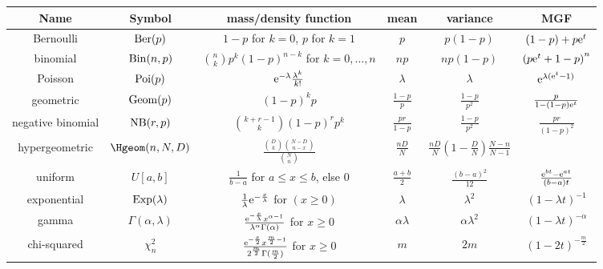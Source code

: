 \begin{center}
{\footnotesize
  \begin{tabular}{|c|c|c|c|c|c|}
    \hline
    Name&Symbol&mass/density function&mean&variance&MGF\\
    \hline
    Bernoulli
        &\(\operatorname{Ber}(p)\)%
        &\(1-p\) for \(k=0\), \(p\) for \(k=1\)%
        &\(p\)
        &\(p(1-p)\)
        &\((1-p)+p\mathrm{e}^t\)
    \\
    binomial
        &\(\operatorname{Bin}(n,p)\)%
        &\(\binom{n}{k}p^k(1-p)^{n-k}\) for \(k=0,\dotsc,n\)
        &\(np\)
        &\(np(1-p)\)
        &\({(p\mathrm{e}^t+1-p)}^n\)
    \\
    Poisson
        &\(\operatorname{Poi}(p)\)
        &\(\mathrm{e}^{-\lambda}\frac{\lambda^k}{k!}\)
        &\(\lambda\)
        &\(\lambda\)
        &\(\mathrm{e}^{\lambda(\mathrm{e}^t-1)}\)
    \\
    geometric
        &\(\operatorname{Geom}(p)\)
        &\((1-p)^k p\)
        &\(\frac{1-p}{p}\)
        &\(\frac{1-p}{p^2}\)
        &\(\frac{p}{1-(1-p)\mathrm{e}^t}\)
    \\
    negative binomial
        &\(\operatorname{NB}(r,p)\)
        &\(\binom{k+r-1}{k}(1-p)^rp^k\)
        &\(\frac{pr}{1-p}\)
        &\(\frac{1-p}{p^2}\)
        &\(\frac{pr}{(1-p)^2}\)
    \\
    hypergeometric
        &\(\Hgeom(n,N,D)\)
        &\(\frac{\binom{D}{k}\binom{N-D}{n-x}}{\binom{N}{n}}\)
        &\(\frac{nD}{N}\)
        &\(\frac{nD}{N}(1-\frac{D}{N})\frac{N-n}{N-1}\)
        &
    \\
    uniform
        &\(U[a,b]\)
        &\(\frac{1}{b-a}\) for \(a\leq x\leq b\), else \(0\)
        &\(\frac{a+b}{2}\)
        &\(\frac{(b-a)^2}{12}\)
        &\(\frac{\mathrm{e}^{bt}-\mathrm{e}^{at}}{(b-a)t}\)
    \\
    exponential
        &\(\operatorname{Exp}(\lambda)\)
        &\(\frac{1}{\lambda}\mathrm{e}^{-\frac{x}{\lambda}}\) for \((x\geq 0)\)
        &\(\lambda\)
        &\(\lambda^2\)
        &\((1-\lambda t)^{-1}\)
    \\
    gamma
        &\(\Gamma(\alpha,\lambda)\)
        &\(\frac{\mathrm{e}^{-\frac{x}{\lambda}}x^{\alpha-1}}
          {\lambda^\alpha\Gamma(\alpha)}\) for \(x\geq 0\)
        &\(\alpha\lambda\)
        &\(\alpha\lambda^2\)
        &\((1-\lambda t)^{-\alpha}\)
    \\
    chi-squared
        &\(\chi^2_n\)
        &\(\frac{\mathrm{e}^{-\frac{x}{2}}x^{\frac{m}{2}-1}}
          {2^{\frac{m}{2}}\Gamma(\frac{m}{2})}\) for \(x\geq 0\)
        &\(m\)
        &\(2m\)
        &\((1-2t)^{-\frac{m}{2}}\)
    \\

\end{tabular}}
\end{center}
